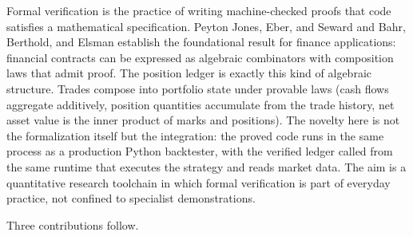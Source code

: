 \documentclass[
  11pt,
  letterpaper,
  DIV=12,
  numbers=noendperiod]{scrartcl}
\numberwithin{equation}{section}
\numberwithin{figure}{section}
\numberwithin{table}{section}
\begin{document}
Formal verification is the practice of writing machine-checked proofs
that code satisfies a mathematical specification. Peyton Jones, Eber,
and Seward  and Bahr, Berthold,
and Elsman  establish the foundational
result for finance applications: financial contracts can be expressed as
algebraic combinators with composition laws that admit proof. The
position ledger is exactly this kind of algebraic structure. Trades
compose into portfolio state under provable laws (cash flows aggregate
additively, position quantities accumulate from the trade history, net
asset value is the inner product of marks and positions). The novelty
here is not the formalization itself but the integration: the proved
code runs in the same process as a production Python backtester, with
the verified ledger called from the same runtime that executes the
strategy and reads market data. The aim is a quantitative research
toolchain in which formal verification is part of everyday practice, not
confined to specialist demonstrations.

Three contributions follow.
\end{document}
